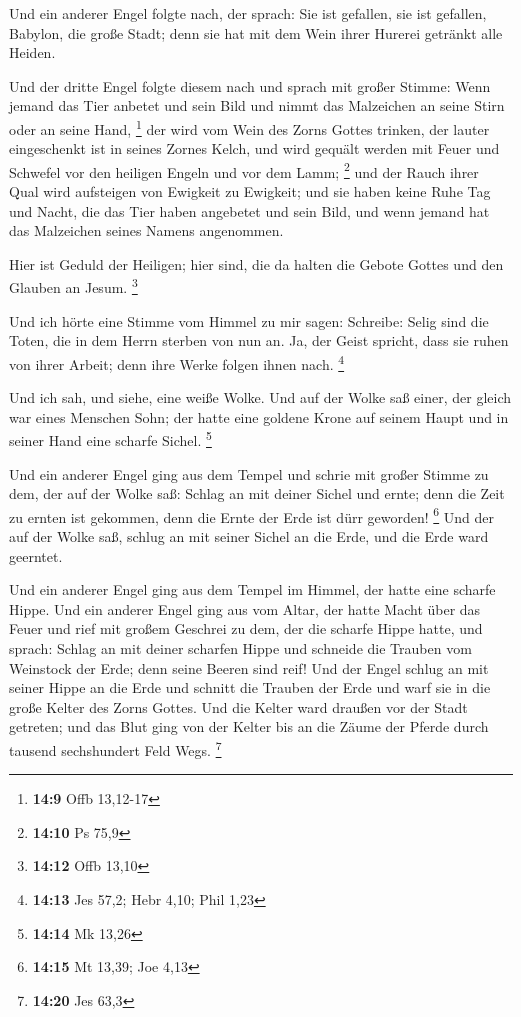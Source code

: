  Und ein anderer Engel folgte nach, der sprach: Sie ist
gefallen, sie ist gefallen, Babylon, die große Stadt; denn sie hat mit
dem Wein ihrer Hurerei getränkt alle Heiden.

 Und der dritte Engel folgte diesem nach und sprach mit
großer Stimme: Wenn jemand das Tier anbetet und sein Bild und nimmt das
Malzeichen an seine Stirn oder an seine Hand, \footnote{\textbf{14:9}
  Offb 13,12-17}  der wird vom Wein des Zorns Gottes
trinken, der lauter eingeschenkt ist in seines Zornes Kelch, und wird
gequält werden mit Feuer und Schwefel vor den heiligen Engeln und vor
dem Lamm; \footnote{\textbf{14:10} Ps 75,9}  und der Rauch
ihrer Qual wird aufsteigen von Ewigkeit zu Ewigkeit; und sie haben keine
Ruhe Tag und Nacht, die das Tier haben angebetet und sein Bild, und wenn
jemand hat das Malzeichen seines Namens angenommen.

 Hier ist Geduld der Heiligen; hier sind, die da halten die
Gebote Gottes und den Glauben an Jesum. \footnote{\textbf{14:12} Offb
  13,10}

 Und ich hörte eine Stimme vom Himmel zu mir sagen:
Schreibe: Selig sind die Toten, die in dem Herrn sterben von nun an. Ja,
der Geist spricht, dass sie ruhen von ihrer Arbeit; denn ihre Werke
folgen ihnen nach. \footnote{\textbf{14:13} Jes 57,2; Hebr 4,10; Phil
  1,23}

 Und ich sah, und siehe, eine weiße Wolke. Und auf der
Wolke saß einer, der gleich war eines Menschen Sohn; der hatte eine
goldene Krone auf seinem Haupt und in seiner Hand eine scharfe Sichel.
\footnote{\textbf{14:14} Mk 13,26}

 Und ein anderer Engel ging aus dem Tempel und schrie mit
großer Stimme zu dem, der auf der Wolke saß: Schlag an mit deiner Sichel
und ernte; denn die Zeit zu ernten ist gekommen, denn die Ernte der Erde
ist dürr geworden! \footnote{\textbf{14:15} Mt 13,39; Joe 4,13}
 Und der auf der Wolke saß, schlug an mit seiner Sichel an
die Erde, und die Erde ward geerntet.

 Und ein anderer Engel ging aus dem Tempel im Himmel, der
hatte eine scharfe Hippe.  Und ein anderer Engel ging aus
vom Altar, der hatte Macht über das Feuer und rief mit großem Geschrei
zu dem, der die scharfe Hippe hatte, und sprach: Schlag an mit deiner
scharfen Hippe und schneide die Trauben vom Weinstock der Erde; denn
seine Beeren sind reif!  Und der Engel schlug an mit seiner
Hippe an die Erde und schnitt die Trauben der Erde und warf sie in die
große Kelter des Zorns Gottes.  Und die Kelter ward draußen
vor der Stadt getreten; und das Blut ging von der Kelter bis an die
Zäume der Pferde durch tausend sechshundert Feld Wegs. \footnote{\textbf{14:20}
  Jes 63,3}

